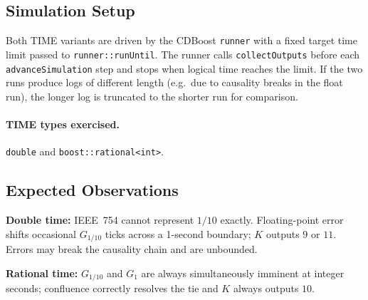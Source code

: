 \subsection*{Simulation Setup}

Both TIME variants are driven by the CDBoost \texttt{runner} with a
fixed target time limit passed to \texttt{runner::runUntil}.  The
runner calls \texttt{collectOutputs} before each
\texttt{advanceSimulation} step and stops when logical time reaches
the limit.  If the two runs produce logs of different length (e.g.\
due to causality breaks in the float run), the longer log is truncated
to the shorter run for comparison.

\paragraph{TIME types exercised.} \texttt{double} and
\texttt{boost::rational<int>}.

\subsection*{Expected Observations}

\textbf{Double time:} IEEE~754 cannot represent $1/10$ exactly.
Floating-point error shifts occasional $G_{1/10}$ ticks across a
1-second boundary; $K$ outputs $9$ or $11$.  Errors may break the
causality chain and are unbounded.

\textbf{Rational time:} $G_{1/10}$ and $G_1$ are always simultaneously
imminent at integer seconds; confluence correctly resolves the tie and
$K$ always outputs $10$.
